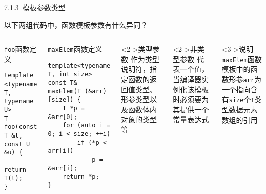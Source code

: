 \begin{frame}[fragile]{7.1.3~模板参数类型}

以下两组代码中，函数\alert{模板参数}有什么异同？

\vspace{-4mm}

\begin{columns}[t]
\begin{blueblock}{\texttt{foo}函数定义}
\vspace{-4mm}
\begin{lstlisting}[moreemph={T,U}]
template <typename T, typename U>
T foo(const T &t, const U &u) {
    return T(t);
}
\end{lstlisting}
\end{blueblock}
\begin{blueblock}{\texttt{maxElem}函数定义}
\vspace{-4mm}
\begin{lstlisting}[moreemph={T}]
template<typename T, int size>
const T& maxElem(T (&arr)[size]) {
    T *p = &arr[0];
    for (auto i = 0; i < size; ++i)
        if (*p < arr[i])
            p = &arr[i];
    return *p;
}
\end{lstlisting}
\end{blueblock}


\begin{block}<2->{类型参数}
作为\alert{类型说明符}，指定函数的返回值类型、形参类型以及函数体内对象的类型等
\end{block}
\begin{block}<2->{非类型参数}
代表一个值，当编译器实例化该模板时必须要为其提供一个\alert{常量}表达式
\end{block}
\begin{yellowblock}<3->{说明}
\texttt{maxElem}函数模板中的函数形参\texttt{arr}为一个指向含有\texttt{size}个\texttt{T}类型数据元素数组的引用
\end{yellowblock}
\end{columns}

\end{frame}


